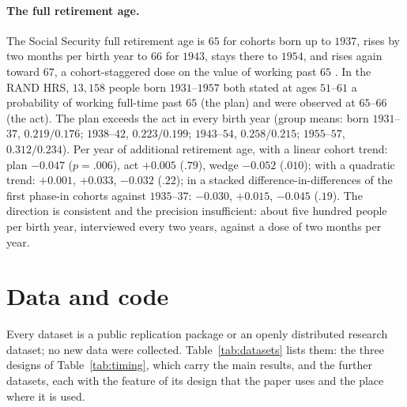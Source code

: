 \documentclass[11pt,a4paper]{article}
\theoremstyle{plain}
\theoremstyle{definition}
\begin{document}
\paragraph{The full retirement age.} The Social Security full retirement age is $65$ for cohorts born up to $1937$,
rises by two months per birth year to $66$ for $1943$, stays there to $1954$, and rises again toward $67$, a
cohort-staggered dose on the value of working past $65$ \citep{mastrobuoni2009}. In the RAND HRS, $13{,}158$ people born
$1931$--$1957$ both stated at ages $51$--$61$ a probability of working full-time past $65$ (the plan) and were observed
at $65$--$66$ (the act). The plan exceeds the act in every birth year (group means: born $1931$--$37$,
$0.219/0.176$; $1938$--$42$, $0.223/0.199$; $1943$--$54$, $0.258/0.215$; $1955$--$57$, $0.312/0.234$). Per year of
additional retirement age, with a linear cohort trend: plan $-0.047$ ($p=.006$), act $+0.005$ ($.79$), wedge $-0.052$
($.010$); with a quadratic trend: $+0.001$, $+0.033$, $-0.032$ ($.22$); in a stacked difference-in-differences of the
first phase-in cohorts against $1935$--$37$: $-0.030$, $+0.015$, $-0.045$ ($.19$). The direction is consistent and the
precision insufficient: about five hundred people per birth year, interviewed every two years, against a dose of two
months per year.

\section{Data and code}
\label{app:data}

Every dataset is a public replication package or an openly distributed research dataset; no new data were collected.
Table~\ref{tab:datasets} lists them: the three designs of Table~\ref{tab:timing}, which carry the main results, and the
further datasets, each with the feature of its design that the paper uses and the place where it is used.
\end{document}
